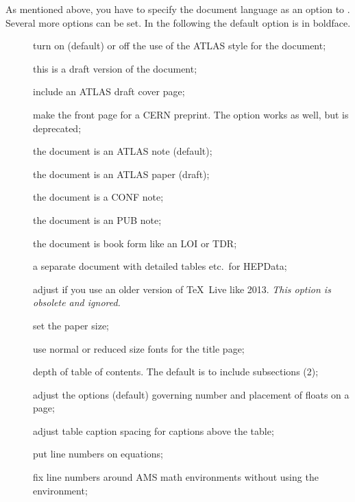 As mentioned above, you have to specify the document language as an option to .
Several more options can be set.
In the following the default option is in boldface.
\begin{description}
\item[] turn on (default) or off the use of the ATLAS style for the document;
\item[] this is a draft version of the document;
\item[] include an ATLAS draft cover page;
\item[] make the front page for a CERN preprint.
  The option  works as well, but is deprecated;
\item[] the document is an ATLAS note (default);
\item[] the document is an ATLAS paper (draft);
\item[] the document is a CONF note;
\item[] the document is an PUB note;
\item[] the document is book form like an LOI or TDR;
\item[] a separate document with detailed tables etc.\ for HEPData;
\item[] adjust if you use an older version of \TeX\ Live like 2013.
  \emph{ This option is obsolete and ignored.}
\item[] set the paper size;
\item[] use normal or reduced size fonts for the title page;
\item[] depth of table of contents. The default is to include subsections (2);
\item[] adjust the options (default) governing number and placement of floats on a page;
\item[] adjust table caption spacing for captions above the table;
\item[] put line numbers on equations;
\item[] fix line numbers around AMS math environments without using the  environment;

\end{description}
